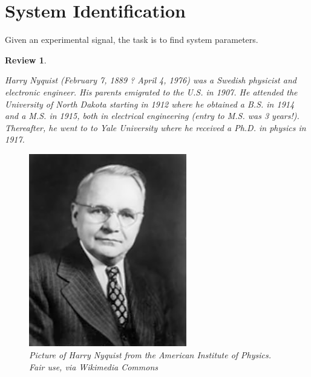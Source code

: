 \documentclass[12pt,letter]{article}
\numberwithin{ex}{section} %
\newtheorem{re}{Review}
\numberwithin{re}{section} %
\newenvironment{review}{\begin{mdframed}[middlelinewidth=2mm,roundcorner=20pt]\begin{re}\normalfont}{\end{re}\end{mdframed}}
\newcommand{\bl}[1]{\textcolor[rgb]{0.00,0.00,1.00}{#1}}
\numberwithin{equation}{section}	%
\begin{document}
%	
%	

	\setcounter{section}{5}	
	\setcounter{figure}{0}   
	\renewcommand\thefigure{\thesection.\arabic{figure}}


\section{System Identification}

Given an experimental signal, the task is to find system parameters. 


\begin{review}
	\label{sec:Laplace_review}
		
		Harry Nyquist (February 7, 1889 ? April 4, 1976) was a Swedish physicist and electronic engineer. His parents emigrated to the U.S. in 1907.  He attended the University of North Dakota starting in 1912 where he obtained a B.S. in 1914 and a M.S. in 1915, both in electrical engineering (entry to M.S. was 3 years!). Thereafter, he went to to Yale University where he received a Ph.D. in physics in 1917.

		\begin{figure}[H]
			\centering
			\includegraphics[width=2.71in]{../figures/Harry_Nyquist.jpg}
			\caption{Picture of Harry Nyquist from the American Institute of Physics. \bl{Fair use, via Wikimedia Commons}}
			\label{fig:fragility_curve}
		\end{figure}


\end{review}
\end{document}
